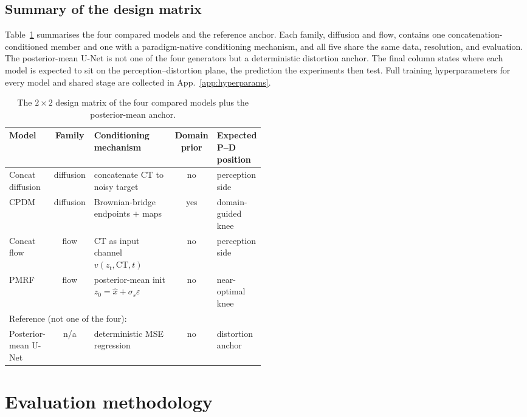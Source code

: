 \documentclass[11pt,a4paper]{article}
\begin{document}
\subsection{Summary of the design matrix}
Table~\ref{tab:design} summarises the four compared models and the reference anchor. Each family,
diffusion and flow, contains one concatenation-conditioned member and one with a paradigm-native
conditioning mechanism, and all five share the same data, resolution, and evaluation. The
posterior-mean U-Net is not one of the four generators but a deterministic distortion anchor. The
final column states where each model is expected to sit on the perception--distortion plane, the
prediction the experiments then test. Full training hyperparameters for every model and shared
stage are collected in App.~\ref{app:hyperparams}.

\begin{table}[h]\centering\small\setlength{\tabcolsep}{4pt}
\caption{The $2\times2$ design matrix of the four compared models plus the posterior-mean anchor.}
\label{tab:design}
\begin{tabular}{l c >{\raggedright\arraybackslash}p{0.33\linewidth} c >{\raggedright\arraybackslash}p{0.16\linewidth}}
\toprule
Model & Family & Conditioning mechanism & Domain prior & Expected P--D position \\
\midrule
Concat diffusion & diffusion & concatenate CT to noisy target & no & perception side \\
CPDM             & diffusion & Brownian-bridge endpoints $+$ maps & yes & domain-guided knee \\
Concat flow      & flow & CT as input channel $v(z_t,\text{CT},t)$ & no & perception side \\
PMRF             & flow & posterior-mean init $z_0=\hat x+\sigma_s\varepsilon$ & no & near-optimal knee \\
\midrule
\multicolumn{5}{l}{Reference (not one of the four):}\\
Posterior-mean U-Net & n/a & deterministic MSE regression & no & distortion anchor \\
\bottomrule
\end{tabular}
\end{table}

\section{Evaluation methodology}
\label{sec:eval}
\end{document}
